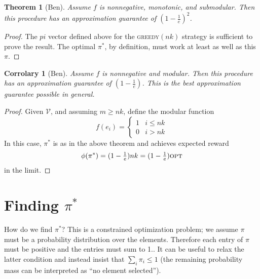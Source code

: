 \documentclass{article}
\newcommand{\cm}[1]{\mathcal{#1}}
\newcommand{\acro}[1]{\textsc{\MakeLowercase{#1}}}
\newtheorem{thm}{Theorem}
\newtheorem{cor}{Corrolary}
\begin{document}
\begin{thm}[Ben]{Assume $f$ is nonnegative, monotonic, and submodular. Then
    this procedure has an approximation guarantee of $(1 - \frac{1}{e})^2$.}
\end{thm}
\begin{proof}
  The $pi$ vector defined above for the \textsc{greedy}$(nk)$ strategy
  is sufficient to prove the result.  The optimal $\pi^\ast$, by
  definition, must work at least as well as this $\pi$.
\end{proof}

\begin{cor}[Ben]{Assume $f$ is nonnegative and modular. Then
    this procedure has an approximation guarantee of $(1 -
    \frac{1}{e})$.  This is the best approximation guarantee
    possible in general.}
\end{cor}
\begin{proof}
  Given $\cm{V}$, and assuming $m \geq nk$, define the modular
  function
  \[
    f(e_i) =
    \begin{cases}
      1 & i \leq nk \\
      0 & i > nk
    \end{cases}
  \]
  In this case, $\pi^\ast$ is as in the above theorem and achieves
  expected reward
  \[
    \phi(\pi^\ast) =
    (1 - \tfrac{1}{e})nk =
    (1 - \tfrac{1}{e})\text{\acro{OPT}}
  \]
  in the limit.
\end{proof}

\section{Finding $\pi^\ast$}

How do we find $\pi^\ast$?  This is a constrained optimization
problem; we assume $\pi$ must be a probability distribution over the
elements.  Therefore each entry of $\pi$ must be positive and the
entries must sum to 1..  It can be useful to relax the latter
condition and instead insist that $\sum_i \pi_i \leq 1$ (the remaining
probability mass can be interpreted as ``no element selected'').
\end{document}
